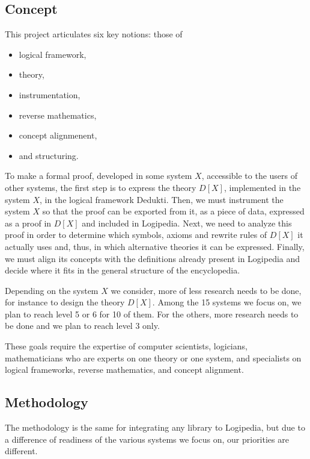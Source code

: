 \subsection{Concept}

This project articulates six key notions: those of 
\begin{itemize}
\item logical framework,
\item theory,
\item instrumentation,
\item reverse mathematics,
\item concept alignmenent,
\item and structuring.
\end{itemize}

To make a formal proof, developed in some system $X$, accessible to
the users of other systems, the first step is to express the theory
$D[X]$, implemented in the system $X$, in the logical framework {\sc
  Dedukti}.  Then, we must instrument the system $X$ so that the proof
can be exported from it, as a piece of data, expressed as a proof in
$D[X]$ and included in {\sc Logipedia}. Next, we need to analyze this
proof in order to determine which symbols, axioms and rewrite rules of
$D[X]$ it actually uses and, thus, in which alternative theories it
can be expressed.  Finally, we must align its concepts with the
definitions already present in {\sc Logipedia} and decide where it
fits in the general structure of the encyclopedia.

Depending on the system $X$ we consider, more of less research needs
to be done, for instance to design the theory $D[X]$. Among the 15
systems we focus on, we plan to reach level 5 or 6 for 10 of them.
For the others, more research needs to be done and we plan to reach
level 3 only.

These goals require the expertise of computer scientists, logicians,
mathematicians who are experts on one theory or one system, and
specialists on logical frameworks, reverse mathematics, and concept
alignment.

\subsection{Methodology}

The methodology is the same for integrating any library to {\sc Logipedia},
but due to a difference of readiness of the various systems we focus on,
our priorities are different.

